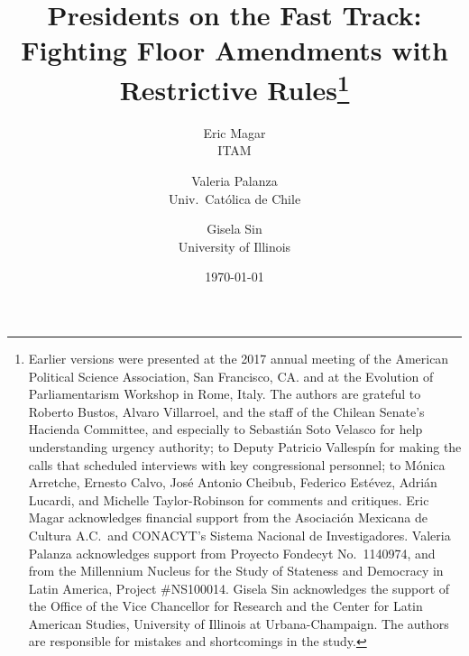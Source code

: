 \documentclass[letter,12pt]{article}
\begin{document}

\title{Presidents on the Fast Track: Fighting Floor Amendments with Restrictive Rules\thanks{Earlier versions were presented at the 2017 annual meeting of the American Political Science Association, San Francisco, CA. and at the Evolution of Parliamentarism Workshop in Rome, Italy. The authors are grateful to Roberto Bustos, Alvaro Villarroel, and the staff of the Chilean Senate's Hacienda Committee, and especially to Sebastián Soto Velasco for help understanding urgency authority; to Deputy Patricio Vallespín for making the calls that scheduled interviews with key congressional personnel; to Mónica Arretche, Ernesto Calvo, José Antonio Cheibub, Federico Estévez, Adrián Lucardi, and Michelle Taylor-Robinson for comments and critiques. Eric Magar acknowledges financial support from the Asociación Mexicana de Cultura A.C.\ and CONACYT's Sistema Nacional de Investigadores. Valeria Palanza acknowledges support from Proyecto Fondecyt No.\ 1140974, and from the Millennium Nucleus for the Study of Stateness and Democracy in Latin America, Project \#NS100014. Gisela Sin acknowledges the support of the Office of the Vice Chancellor for Research and the Center for Latin American Studies, University of Illinois at Urbana-Champaign. The authors are responsible for mistakes and shortcomings in the study.}}
\author{Eric Magar \\ ITAM \and
        Valeria Palanza \\ Univ.\ Católica de Chile \and  
        Gisela Sin \\ University of Illinois
}
\date{\today}
\maketitle

\end{document}
